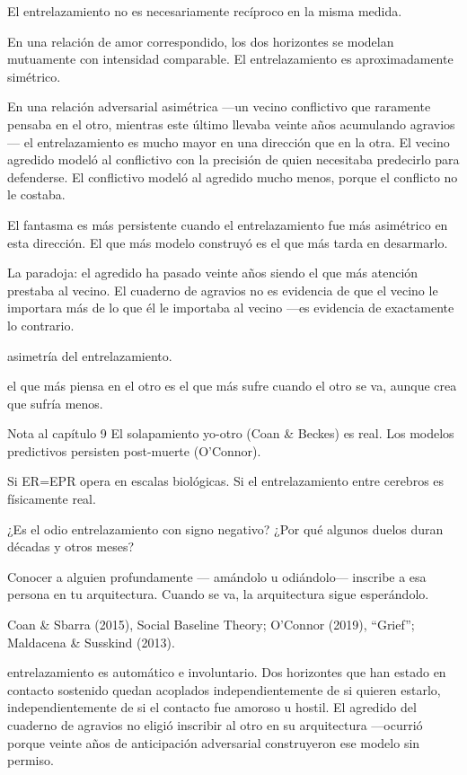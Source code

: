 \noindent El entrelazamiento no es necesariamente recíproco en la misma medida.

En una relación de amor correspondido, los dos horizontes se modelan mutuamente con intensidad comparable. El entrelazamiento es aproximadamente simétrico.

En una relación adversarial asimétrica —un vecino conflictivo que raramente pensaba en el otro, mientras este último llevaba veinte años acumulando agravios— el entrelazamiento es mucho mayor en una dirección que en la otra. El vecino agredido modeló al conflictivo con la precisión de quien necesitaba predecirlo para defenderse. El conflictivo modeló al agredido mucho menos, porque el conflicto no le costaba.

El fantasma es más persistente cuando el entrelazamiento fue más asimétrico en esta dirección. El que más modelo construyó es el que más tarda en desarmarlo.

La paradoja: el agredido ha pasado veinte años siendo el que más atención prestaba al vecino. El cuaderno de agravios no es evidencia de que el vecino le importara más de lo que él le importaba al vecino —es evidencia de exactamente lo contrario.

\begin{fisica}
 asimetría del entrelazamiento.

 el que más piensa en el otro es el que más sufre cuando el otro se va, aunque crea que sufría menos.
\end{fisica}
\begin{notacap}{Nota al capítulo 9}
 El solapamiento yo-otro (Coan \& Beckes) es real. Los modelos predictivos persisten post-muerte (O’Connor).

 Si ER=EPR opera en escalas biológicas. Si el entrelazamiento entre cerebros es físicamente real.

 ¿Es el odio entrelazamiento con signo negativo? ¿Por qué algunos duelos duran décadas y otros meses?

 Conocer a alguien profundamente — amándolo u odiándolo— inscribe a esa persona en tu arquitectura. Cuando se va, la arquitectura sigue esperándolo.

 Coan \& Sbarra (2015), Social Baseline Theory; O’Connor (2019), “Grief”; Maldacena \& Susskind (2013).
\end{notacap}
\noindent {} entrelazamiento es automático e involuntario. Dos horizontes que han estado en contacto sostenido quedan acoplados independientemente de si quieren estarlo, independientemente de si el contacto fue amoroso u hostil. El agredido del cuaderno de agravios no eligió inscribir al otro en su arquitectura —ocurrió porque veinte años de anticipación adversarial construyeron ese modelo sin permiso.

